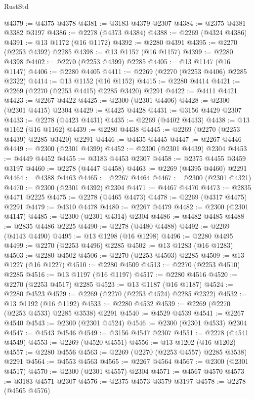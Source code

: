\begin{lexlean}{RustStd}
\begin{coremodule}
@4379 := @4375 @4378
@4381 := @3183 @4379 @2307
@4384 := @2375 @4381 @3382 @3197
@4386 := @2278 (@4373 @4384)
@4388 := @2269 (@4324 @4386)
@4391 := @13 @1172 (@16 @1172)
@4392 := @2280 @4391
@4395 := @2270 (@2253 @4392) @2285
@4398 := @13 @1157 (@16 @1157)
@4399 := @2280 @4398
@4402 := @2270 (@2253 @4399) @2285
@4405 := @13 @1147 (@16 @1147)
@4406 := @2280 @4405
@4411 := @2269 (@2270 (@2253 @4406) @2285 @2322)
@4414 := @13 @1152 (@16 @1152)
@4415 := @2280 @4414
@4421 := @2269 (@2270 (@2253 @4415) @2285 @3420) @2291
@4422 := @4411 @4421
@4423 := @2267 @4422
@4425 := @2300 (@2301 @4406)
@4428 := @2300 (@2301 @4415) @2304
@4429 := @4425 @4428
@4431 := @3156 @4429 @2307
@4433 := @2278 (@4423 @4431)
@4435 := @2269 (@4402 @4433)
@4438 := @13 @1162 (@16 @1162)
@4439 := @2280 @4438
@4445 := @2269 (@2270 (@2253 @4439) @2285 @3420) @2291
@4446 := @4435 @4445
@4447 := @2267 @4446
@4449 := @2300 (@2301 @4399)
@4452 := @2300 (@2301 @4439) @2304
@4453 := @4449 @4452
@4455 := @3183 @4453 @2307
@4458 := @2375 @4455 @3459 @3197
@4460 := @2278 (@4447 @4458)
@4463 := @2269 (@4395 @4460) @2291
@4464 := @4388 @4463
@4465 := @2267 @4464
@4467 := @2300 (@2301 @4321)
@4470 := @2300 (@2301 @4392) @2304
@4471 := @4467 @4470
@4473 := @2835 @4471 @2225
@4475 := @2278 (@4465 @4473)
@4478 := @2269 (@4317 @4475) @2291
@4479 := @4310 @4478
@4480 := @2267 @4479
@4482 := @2300 (@2301 @4147)
@4485 := @2300 (@2301 @4314) @2304
@4486 := @4482 @4485
@4488 := @2835 @4486 @2225
@4490 := @2278 (@4480 @4488)
@4492 := @2269 (@4143 @4490)
@4495 := @13 @1298 (@16 @1298)
@4496 := @2280 @4495
@4499 := @2270 (@2253 @4496) @2285
@4502 := @13 @1283 (@16 @1283)
@4503 := @2280 @4502
@4506 := @2270 (@2253 @4503) @2285
@4509 := @13 @1227 (@16 @1227)
@4510 := @2280 @4509
@4513 := @2270 (@2253 @4510) @2285
@4516 := @13 @1197 (@16 @1197)
@4517 := @2280 @4516
@4520 := @2270 (@2253 @4517) @2285
@4523 := @13 @1187 (@16 @1187)
@4524 := @2280 @4523
@4529 := @2269 (@2270 (@2253 @4524) @2285 @2322)
@4532 := @13 @1192 (@16 @1192)
@4533 := @2280 @4532
@4539 := @2269 (@2270 (@2253 @4533) @2285 @3538) @2291
@4540 := @4529 @4539
@4541 := @2267 @4540
@4543 := @2300 (@2301 @4524)
@4546 := @2300 (@2301 @4533) @2304
@4547 := @4543 @4546
@4549 := @3156 @4547 @2307
@4551 := @2278 (@4541 @4549)
@4553 := @2269 (@4520 @4551)
@4556 := @13 @1202 (@16 @1202)
@4557 := @2280 @4556
@4563 := @2269 (@2270 (@2253 @4557) @2285 @3538) @2291
@4564 := @4553 @4563
@4565 := @2267 @4564
@4567 := @2300 (@2301 @4517)
@4570 := @2300 (@2301 @4557) @2304
@4571 := @4567 @4570
@4573 := @3183 @4571 @2307
@4576 := @2375 @4573 @3579 @3197
@4578 := @2278 (@4565 @4576)

\end{coremodule}
\end{lexlean}
